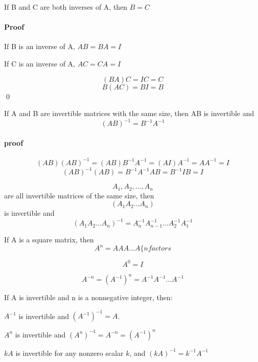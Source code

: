 \begin{theorem}[]
	If B and C are both inverses of A, then $B = C$
\end{theorem}

\paragraph{Proof}
	If B is an inverse of A, $AB = BA = I$

	If C is an inverse of A, $AC = CA = I$

	\[(BA)C = IC = C\]
	\[B(AC) = BI = B\] \qed

\begin{theorem}[]
	If A and B are invertible matrices with the same size, then AB is invertible and
	\[(AB)^{-1} = B^{-1}A^{-1}\]
\end{theorem}

\paragraph{proof}
\[(AB)(AB)^{-1} = (AB) B^{-1}A^{-1} = (AI)A^{-1} = A A^{-1} = I\]
\[(AB)^{-1}(AB) = B^{-1}A^{-1}AB = B^{-1}IB = I\]

\begin{corollary}[]
\[A_1,A_2,\ldots,A_{n}\] are all invertible matrices of the same size, then
\[(A_1A_2 \ldots A_{n})\] is invertible and
\[(A_1A_2 \ldots A_{n})^{-1}= A_{n}^{-1}A_{n-1}^{-1}\ldots A_{2}^{-1}A_1^{-1}\]
\end{corollary}

\begin{definition}[]
	If A is a square matrix, then \[A^{n} = A A A \ldots A \{n factors\]

		\[A^{0} = I\]

		\[A^{-n} = (A^{-1})^{n} = A^{-1}A^{-1}\ldots A^{-1}\]
\end{definition}

\begin{theorem}[]
	If A is invertible and n is a nonnegative integer, then:

	$A^{-1}$ is invertible and $(A^{-1})^{-1} = A$.

	$A^{n}$ is invertible and $(A^{n})^{-1} = A^{-n} = (A^{-1})^{n}$

	$kA$ is invertible for any nonzero scalar $k$, and $(kA)^{-1} = k^{-1}A^{-1}$
\end{theorem}

